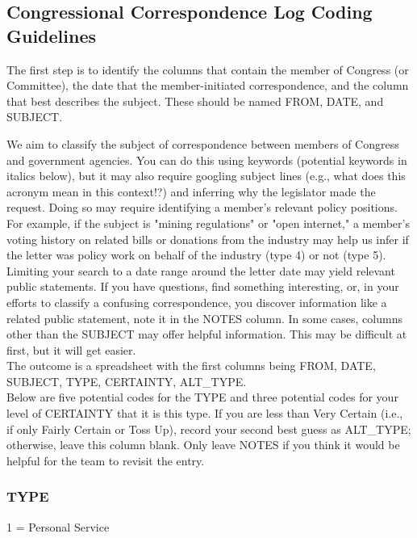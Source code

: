 \subsection{Congressional Correspondence Log Coding Guidelines}

The first step is to identify the columns that contain the member of Congress (or Committee), the date that the member-initiated correspondence, and the column that best describes the subject. These should be named FROM, DATE, and SUBJECT. 

We aim to classify the subject of correspondence between members of Congress and government agencies. You can do this using keywords (potential keywords in italics below), but it may also require googling subject lines (e.g., what does this acronym mean in this context!?) and inferring why the legislator made the request. Doing so may require identifying a member's relevant policy positions. For example, if the subject is "mining regulations" or "open internet," a member's voting history on related bills or donations from the industry may help us infer if the letter was policy work on behalf of the industry (type 4) or not (type 5). Limiting your search to a date range around the letter date may yield relevant public statements. If you have questions, find something interesting, or, in your efforts to classify a confusing correspondence, you discover information like a related public statement, note it in the NOTES column. In some cases, columns other than the SUBJECT may offer helpful information. This may be difficult at first, but it will get easier. \\

The outcome is a spreadsheet with the first columns being FROM, DATE, SUBJECT, TYPE, CERTAINTY, ALT\_TYPE.\\


Below are five potential codes for the TYPE and three potential codes for your level of CERTAINTY that it is this type. If you are less than Very Certain (i.e., if only Fairly Certain or Toss Up), record your second best guess as ALT\_TYPE; otherwise, leave this column blank. Only leave NOTES if you think it would be helpful for the team to revisit the entry.

\subsubsection{TYPE}

1 = Personal Service\\


